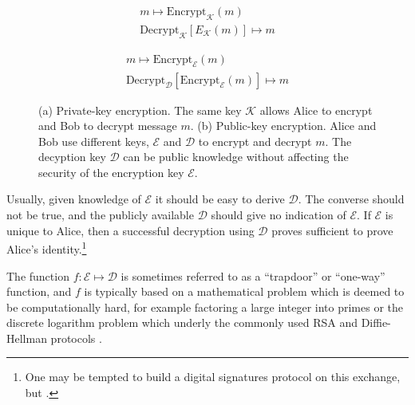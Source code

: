 \begin{figure}[htp]
\centering
\captionsetup{width=0.8\linewidth}
\begin{framed}
\begin{subfigure}{0.4\textwidth}
\begin{align*}
m \mapsto \text{Encrypt}_\mathcal{K}\left(m\right) \\
\text{Decrypt}_\mathcal{K}\left[E_\mathcal{K}\left(m\right)\right] \mapsto m
\end{align*}
\caption{}
\end{subfigure}
\begin{subfigure}{0.4\textwidth}
\begin{align*}
m \mapsto \text{Encrypt}_\mathcal{E}\left(m\right) \\
\text{Decrypt}_\mathcal{D}\left[\text{Encrypt}_\mathcal{E}\left(m\right)\right] \mapsto m
\end{align*}
\caption{}
\end{subfigure}
\caption{(a) Private-key encryption. The same key $\mathcal{K}$ allows Alice to encrypt and Bob to decrypt message $m$. (b) Public-key encryption. Alice and Bob use different keys, $\mathcal{E}$ and $\mathcal{D}$ to encrypt and decrypt $m$. The decyption key $\mathcal{D}$ can be public knowledge without affecting the security of the encryption key $\mathcal{E}$.}
\label{fig:pubpriv}
\end{framed}
\end{figure}

Usually, given knowledge of $\mathcal{E}$ it should be easy to derive $\mathcal{D}$. The converse should not be true, and the publicly available $\mathcal{D}$ should give no indication of $\mathcal{E}$. If $\mathcal{E}$ is unique to Alice, then a successful decryption using $\mathcal{D}$ proves sufficient to prove Alice's identity.\footnote{One may be tempted to build a digital signatures protocol on this exchange, but .}

The function $f: \mathcal{E} \mapsto \mathcal{D}$ is sometimes referred to as a ``trapdoor'' or ``one-way'' function, and $f$ is typically based on a mathematical problem which is deemed to be computationally hard, for example factoring a large integer into primes or the discrete logarithm problem which underly the commonly used RSA \cite{Rivest1978} and Diffie-Hellman \cite{Diffie1976} protocols \cite{Schneier1996}.

\MT{----------------------}

